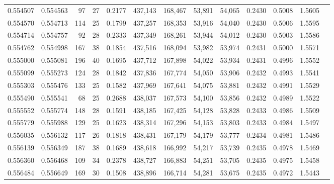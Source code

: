 \begin{tabular}{rrrrrrrrrrrrr}
0.554507 & 0.554563 &     97 &    27 &                                     0.2177 & 437,143 & 168,467 &  53,891 &  54,065 & 0.2430 & 0.5008 & 1.5605 \\
0.554570 & 0.554713 &    114 &    25 &                                     0.1799 & 437,257 & 168,353 &  53,916 &  54,040 & 0.2430 & 0.5006 & 1.5595 \\
0.554714 & 0.554757 &     92 &    28 &                                     0.2333 & 437,349 & 168,261 &  53,944 &  54,012 & 0.2430 & 0.5003 & 1.5586 \\
0.554762 & 0.554998 &    167 &    38 &                                     0.1854 & 437,516 & 168,094 &  53,982 &  53,974 & 0.2431 & 0.5000 & 1.5571 \\
0.555000 & 0.555081 &    196 &    40 &                                     0.1695 & 437,712 & 167,898 &  54,022 &  53,934 & 0.2431 & 0.4996 & 1.5552 \\
0.555099 & 0.555273 &    124 &    28 &                                     0.1842 & 437,836 & 167,774 &  54,050 &  53,906 & 0.2432 & 0.4993 & 1.5541 \\
0.555303 & 0.555476 &    133 &    25 &                                     0.1582 & 437,969 & 167,641 &  54,075 &  53,881 & 0.2432 & 0.4991 & 1.5529 \\
0.555490 & 0.555541 &     68 &    25 &                                     0.2688 & 438,037 & 167,573 &  54,100 &  53,856 & 0.2432 & 0.4989 & 1.5522 \\
0.555552 & 0.555774 &    148 &    28 &                                     0.1591 & 438,185 & 167,425 &  54,128 &  53,828 & 0.2433 & 0.4986 & 1.5509 \\
0.555779 & 0.555988 &    129 &    25 &                                     0.1623 & 438,314 & 167,296 &  54,153 &  53,803 & 0.2433 & 0.4984 & 1.5497 \\
0.556035 & 0.556132 &    117 &    26 &                                     0.1818 & 438,431 & 167,179 &  54,179 &  53,777 & 0.2434 & 0.4981 & 1.5486 \\
0.556139 & 0.556349 &    187 &    38 &                                     0.1689 & 438,618 & 166,992 &  54,217 &  53,739 & 0.2435 & 0.4978 & 1.5469 \\
0.556360 & 0.556468 &    109 &    34 &                                     0.2378 & 438,727 & 166,883 &  54,251 &  53,705 & 0.2435 & 0.4975 & 1.5458 \\
0.556484 & 0.556649 &    169 &    30 &                                     0.1508 & 438,896 & 166,714 &  54,281 &  53,675 & 0.2435 & 0.4972 & 1.5443 \\

\end{tabular}
